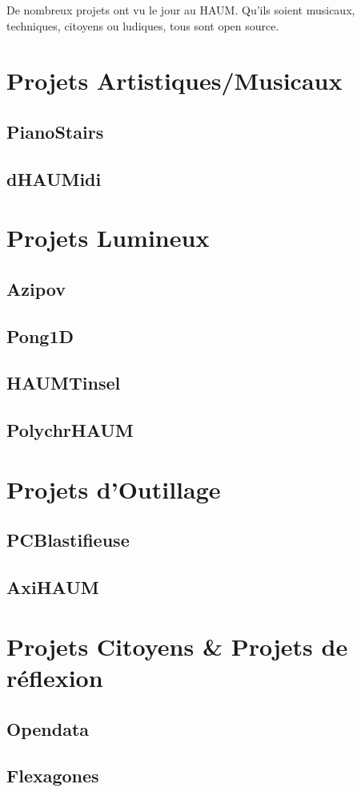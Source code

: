 De nombreux projets ont vu le jour au HAUM. Qu'ils soient musicaux, techniques, citoyens ou ludiques, tous sont
open source.

\section{Projets Artistiques/Musicaux}

\subsection{PianoStairs}

\subsection{dHAUMidi}


\section{Projets Lumineux}

\subsection{Azipov}

\subsection{Pong1D}

\subsection{HAUMTinsel}

\subsection{PolychrHAUM}

\section{Projets d'Outillage}

\subsection{PCBlastifieuse}

\subsection{AxiHAUM}

\section{Projets Citoyens \& Projets de réflexion}

\subsection{Opendata}

\subsection{Flexagones}
